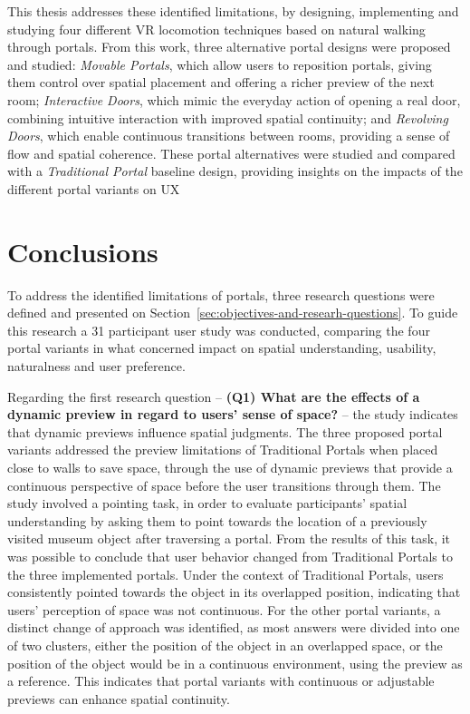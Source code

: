 This thesis addresses these identified limitations, by designing, implementing and studying four different \gls{VR} locomotion techniques 
based on natural walking through portals. From this work, three alternative portal designs were proposed and studied: 
\textit{Movable Portals}, which allow users to reposition portals, giving them control over spatial placement and offering 
a richer preview of the next room; \textit{Interactive Doors}, which mimic the everyday action of opening a real door, combining 
intuitive interaction with improved spatial continuity; and \textit{Revolving Doors}, which enable continuous transitions between rooms, 
providing a sense of flow and spatial coherence. These portal alternatives were studied and compared with a \textit{Traditional Portal} 
baseline design, providing insights on the impacts of the different portal variants on \gls{UX}

\section{Conclusions}
\label{sec:conclusions}

To address the identified limitations of portals, three research questions were defined and presented on 
Section~\ref{sec:objectives-and-researh-questions}. To guide this research a 31 participant user study was conducted, comparing the four portal 
variants in what concerned  impact on spatial understanding, usability, naturalness and user preference.

Regarding the first research question -- \textbf{(Q1) What are the effects of a dynamic preview in regard to users' sense of space?} --
the study indicates that dynamic previews influence spatial judgments. 
The three proposed portal variants addressed the preview limitations of Traditional Portals when placed close to walls to save space, through the 
use of dynamic previews that provide a continuous perspective of space before the user transitions through them.
The study involved a pointing task, in order to evaluate participants' spatial understanding by
asking them to point towards the location of a previously visited museum object after traversing a portal.
From the results of this task, it was possible to conclude that user behavior changed from Traditional Portals to the three implemented portals.
Under the context of Traditional Portals, users consistently pointed towards the object in its overlapped position, indicating that users' perception 
of space was not continuous.
For the other portal variants, a distinct change of approach was identified, as most answers were divided into one of two clusters, either the 
position of the object in an overlapped space, or the position of the object would be in a continuous environment, using the preview as a reference. 
This indicates that portal variants with continuous or adjustable previews can enhance spatial continuity. 

